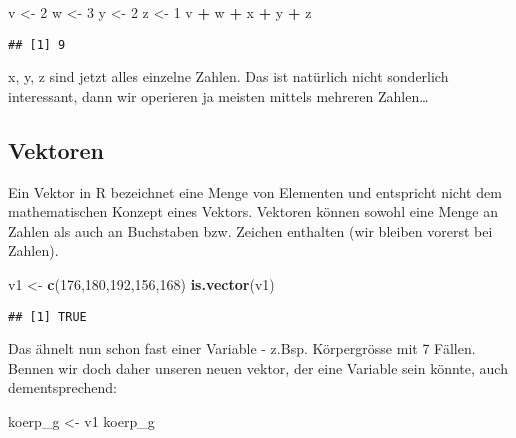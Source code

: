 \documentclass[
]{book}
\newenvironment{Shaded}{\begin{snugshade}}{\end{snugshade}}
\newcommand{\DecValTok}[1]{\textcolor[rgb]{0.00,0.00,0.81}{#1}}
\newcommand{\KeywordTok}[1]{\textcolor[rgb]{0.13,0.29,0.53}{\textbf{#1}}}
\newcommand{\NormalTok}[1]{#1}
\newcommand{\OperatorTok}[1]{\textcolor[rgb]{0.81,0.36,0.00}{\textbf{#1}}}
\newcommand{\StringTok}[1]{\textcolor[rgb]{0.31,0.60,0.02}{#1}}
\begin{document}
\begin{Shaded}
\begin{Highlighting}[]
\NormalTok{v <-}\StringTok{ }\DecValTok{2}
\NormalTok{w <-}\StringTok{ }\DecValTok{3}
\NormalTok{y <-}\StringTok{ }\DecValTok{2}
\NormalTok{z <-}\StringTok{ }\DecValTok{1}
\NormalTok{v }\OperatorTok{+}\StringTok{ }\NormalTok{w }\OperatorTok{+}\StringTok{ }\NormalTok{x }\OperatorTok{+}\StringTok{ }\NormalTok{y }\OperatorTok{+}\StringTok{ }\NormalTok{z}
\end{Highlighting}
\end{Shaded}

\begin{verbatim}
## [1] 9
\end{verbatim}

x, y, z sind jetzt alles einzelne Zahlen. Das ist natürlich nicht sonderlich interessant, dann wir operieren ja meisten mittels mehreren Zahlen\ldots{}

\hypertarget{vektoren}{%
\subsection{Vektoren}\label{vektoren}}

Ein Vektor in R bezeichnet eine Menge von Elementen und entspricht nicht dem mathematischen
Konzept eines Vektors. Vektoren können sowohl eine Menge an Zahlen als auch an Buchstaben bzw. Zeichen enthalten (wir bleiben vorerst bei Zahlen).

\begin{Shaded}
\begin{Highlighting}[]
\NormalTok{v1 <-}\StringTok{ }\KeywordTok{c}\NormalTok{(}\DecValTok{176}\NormalTok{,}\DecValTok{180}\NormalTok{,}\DecValTok{192}\NormalTok{,}\DecValTok{156}\NormalTok{,}\DecValTok{168}\NormalTok{)}
\KeywordTok{is.vector}\NormalTok{(v1)}
\end{Highlighting}
\end{Shaded}

\begin{verbatim}
## [1] TRUE
\end{verbatim}

Das ähnelt nun schon fast einer Variable - z.Bsp. Körpergrösse mit 7 Fällen. Bennen wir doch daher unseren neuen vektor, der eine Variable sein könnte, auch dementsprechend:

\begin{Shaded}
\begin{Highlighting}[]
\NormalTok{koerp_g <-}\StringTok{ }\NormalTok{v1}
\NormalTok{koerp_g}
\end{Highlighting}
\end{Shaded}
\end{document}
